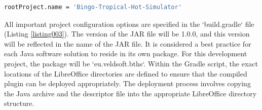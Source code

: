 \documentclass[12pt,twoside,openany]{book}
\begin{document}
\begin{lstlisting}[language=bash, caption={settings.gradle}, label=listing002]
	rootProject.name = 'Bingo-Tropical-Hot-Simulator'
\end{lstlisting}

All important project configuration options are specified in the `build.gradle` file (Listing \ref{listing003}). The version of the JAR file will be 1.0.0, and this version will be reflected in the name of the JAR file. It is considered a best practice for each Java software solution to reside in its own package. For this development project, the package will be `eu.veldsoft.bths`. Within the Gradle script, the exact locations of the LibreOffice directories are defined to ensure that the compiled plugin can be deployed appropriately. The deployment process involves copying the Java archive and the descriptor file into the appropriate LibreOffice directory structure.
\end{document}
